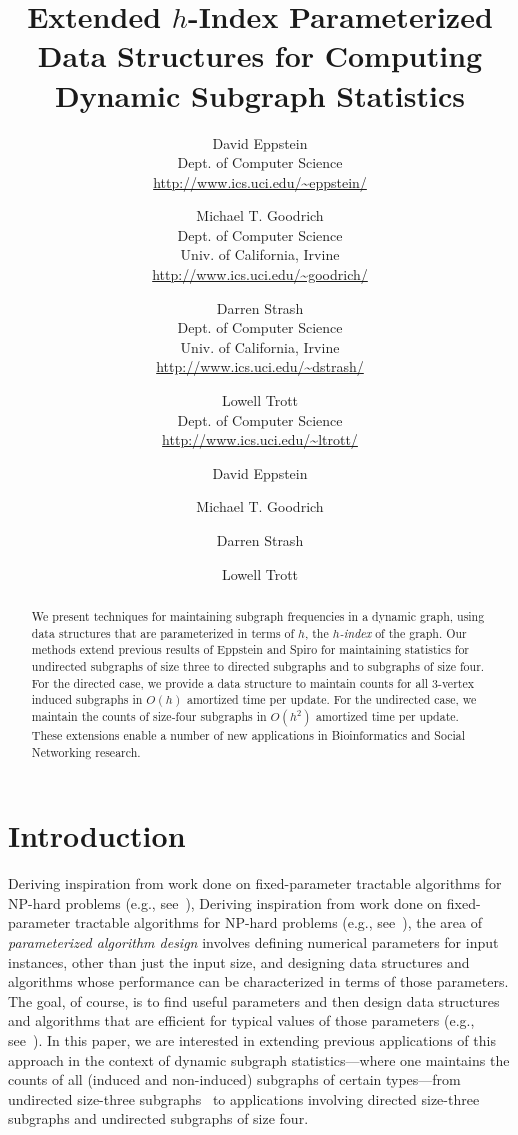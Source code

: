 \documentclass[11pt]{article}
\title{Extended $h$-Index Parameterized Data Structures for Computing Dynamic Subgraph Statistics}
\author{
David Eppstein \\
Dept. of Computer Science \\
\url{http://www.ics.uci.edu/~eppstein/}
\and
Michael T. Goodrich \\
Dept. of Computer Science \\
Univ. of California, Irvine \\
\url{http://www.ics.uci.edu/~goodrich/}
\and 
Darren Strash \\
Dept. of Computer Science \\
Univ. of California, Irvine \\
\url{http://www.ics.uci.edu/~dstrash/}
\and
Lowell Trott \\
Dept. of Computer Science \\
\url{http://www.ics.uci.edu/~ltrott/}
}
\date{}
\author{David Eppstein \and Michael T. Goodrich \and Darren Strash \and Lowell Trott}
\institute{Computer Science Department, University of California, Irvine, USA.}
\begin{document}
\maketitle

\pagestyle{plain}


\begin{abstract} We present techniques for maintaining 
subgraph frequencies in a dynamic graph,
using data structures that are parameterized in terms of $h$, the 
\emph{$h$-index} of the graph.
Our methods extend previous results of Eppstein and Spiro for
maintaining statistics for undirected subgraphs of size three to
directed subgraphs and to subgraphs of size four.
For the directed case, we provide a data 
structure to maintain counts for all 3-vertex induced subgraphs 
in $O(h)$ amortized time per update.
For the undirected case, we maintain the counts of size-four subgraphs
in $O(h^2)$ amortized time per update.
These extensions enable a number of new applications in
Bioinformatics and Social Networking research.
\end{abstract}

\section{Introduction}
\ifFull
Deriving inspiration from work done on
fixed-parameter tractable algorithms for NP-hard problems (e.g.,
see~\cite{cllor-fpadf-08,dffht-fparp-05,df-fptcb-95,gghnw-cbfp-06,nr-oefpa-03}),
\else
Deriving inspiration from work done on
fixed-parameter tractable algorithms for NP-hard problems (e.g.,
see~\cite{dffht-fparp-05,df-fptcb-95,nr-oefpa-03}),
\fi
the area of
\emph{parameterized algorithm design} involves defining numerical
parameters for input instances, other than just the input size,
and designing data structures and algorithms whose performance
can be characterized in terms of those parameters.
The goal, of course, is to find useful parameters and
then design data structures and algorithms that are efficient for
typical values of those parameters 
(e.g., see~\cite{eg-snprn-08,es-hgadss-09}).
In this paper, we are interested in extending previous applications
of this approach in the context of dynamic subgraph statistics---where 
one maintains the counts of all (induced and non-induced) subgraphs 
of certain types---from undirected size-three
subgraphs~\cite{es-hgadss-09} to applications involving directed size-three
subgraphs and undirected subgraphs of size four.
\end{document}
